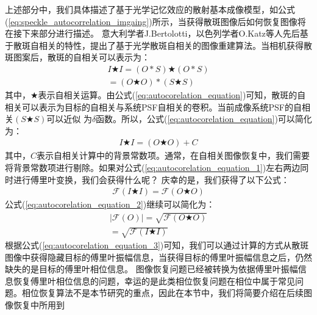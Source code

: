 上述部分中，我们具体描述了基于光学记忆效应的散射基本成像模型，如公式(\ref{eq:speckle_autocorrelation_imgaing})所示，当获得散斑图像后如何恢复图像将在接下来部分进行描述。
意大利学者J.Bertolotti，以色列学者O.Katz等人先后基于散斑自相关的特性，提出了基于光学散斑自相关的图像重建算法。当相机获得散斑图案后，散斑的自相关可以表示为：
\begin{equation}
\begin{aligned}
    I \bigstar I  = (O*S) \bigstar (O*S) \\
		              =  (O \bigstar O)*(S \bigstar S)
\end{aligned}
\label{eq:autocorelation_equation}
\end{equation}
其中，$\bigstar$表示自相关运算。由公式(\ref{eq:autocorelation_equation})可知，散斑的自相关可以表示为目标的自相关与系统PSF自相关的卷积。当前成像系统PSF的自相关$(S \bigstar S)$可以近似
为$\delta$函数。所以，公式(\ref{eq:autocorelation_equation})可以简化为：
\begin{equation}
\begin{aligned}
    I \bigstar I  = (O \bigstar O)+C
\end{aligned}
\label{eq:autocorelation_equation_1}
\end{equation}
其中，$C$表示自相关计算中的背景常数项。通常，在自相关图像恢复中，我们需要将背景常数项进行剔除。如果对公式(\ref{eq:autocorelation_equation_1})左右两边同时进行傅里叶变换，我们会获得什么呢？
庆幸的是，我们获得了以下公式：
\begin{equation}
\begin{aligned}
    \mathcal{F}(I \bigstar I)  = \mathcal{F}(O \bigstar O)
\end{aligned}
\label{eq:autocorelation_equation_2}
\end{equation}
公式(\ref{eq:autocorelation_equation_2})继续可以简化为：
\begin{equation}
\begin{aligned}
    \mid \mathcal{F}(O) \mid = \sqrt{\mathcal{F}(O \bigstar O)}\\
		               = \sqrt{\mathcal{F}(I \bigstar I)}
\end{aligned}
\label{eq:autocorelation_equation_3}
\end{equation}
根据公式(\ref{eq:autocorelation_equation_3})可知，我们可以通过计算的方式从散斑图像中获得隐藏目标的傅里叶振幅信息，当获得目标的傅里叶振幅信息之后，仍然缺失的是目标的傅里叶相位信息。
图像恢复问题已经被转换为依据傅里叶振幅信息恢复傅里叶相位信息的问题，幸运的是此类相位恢复问题在相位中属于常见问题。相位恢复算法不是本节研究的重点，因此在本节中，我们将简要介绍在后续图像恢复中所用到
